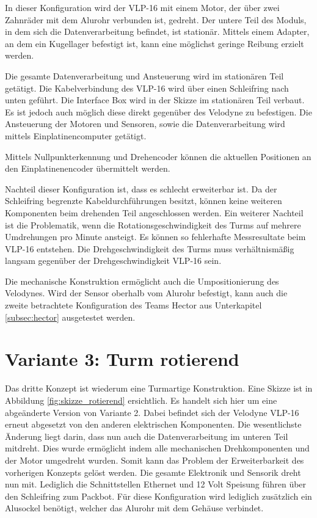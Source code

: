 In dieser Konfiguration wird der VLP-16 mit einem Motor, der über zwei Zahnräder mit dem Alurohr verbunden ist, gedreht. Der untere Teil des Moduls, in dem sich die Datenverarbeitung befindet, ist stationär. Mittels einem Adapter, an dem ein Kugellager befestigt ist, kann eine möglichst geringe Reibung erzielt werden.

Die gesamte Datenverarbeitung und Ansteuerung wird im stationären Teil getätigt. Die Kabelverbindung des VLP-16 wird über einen Schleifring nach unten geführt. Die Interface Box wird in der Skizze im stationären Teil verbaut. Es ist jedoch auch möglich diese direkt gegenüber des Velodyne zu befestigen. Die Ansteuerung der Motoren und Sensoren, sowie die Datenverarbeitung wird mittels Einplatinencomputer getätigt.

Mittels Nullpunkterkennung und Drehencoder können die aktuellen Positionen an den Einplatinenencoder übermittelt werden.

Nachteil dieser Konfiguration ist, dass es schlecht erweiterbar ist. Da der Schleifring begrenzte Kabeldurchführungen besitzt, können keine weiteren Komponenten beim drehenden Teil angeschlossen werden. Ein weiterer Nachteil ist die Problematik, wenn die Rotationsgeschwindigkeit des Turms auf mehrere Umdrehungen pro Minute ansteigt. Es können so fehlerhafte Messresultate beim VLP-16 entstehen. Die Drehgeschwindigkeit des Turms muss verhältnismäßig langsam gegenüber der Drehgeschwindigkeit VLP-16 sein.

Die mechanische Konstruktion ermöglicht auch die Umpositionierung des Velodynes. Wird der Sensor oberhalb vom Alurohr befestigt, kann auch die zweite betrachtete Konfiguration des Teams Hector aus Unterkapitel \ref{subsec:hector} ausgetestet werden.

\section {Variante 3: Turm rotierend}
\label{sec:var3}
Das dritte Konzept ist wiederum eine Turmartige Konstruktion. Eine Skizze ist in Abbildung \ref{fig:skizze_rotierend} ersichtlich. Es handelt sich hier um eine abgeänderte Version von Variante 2. Dabei befindet sich der Velodyne VLP-16 erneut abgesetzt von den anderen elektrischen Komponenten. Die wesentlichste Änderung liegt darin, dass nun auch die Datenverarbeitung im unteren Teil mitdreht. 
Dies wurde ermöglicht indem alle mechanischen Drehkomponenten und der Motor umgedreht wurden. Somit kann das Problem der Erweiterbarkeit des vorherigen Konzepts gelöst werden. Die gesamte Elektronik und Sensorik dreht nun mit. Lediglich die Schnittstellen Ethernet und 12 Volt Speisung führen über den Schleifring zum Packbot. Für diese Konfiguration wird lediglich zusätzlich ein Alusockel benötigt, welcher das Alurohr mit dem Gehäuse verbindet. 

